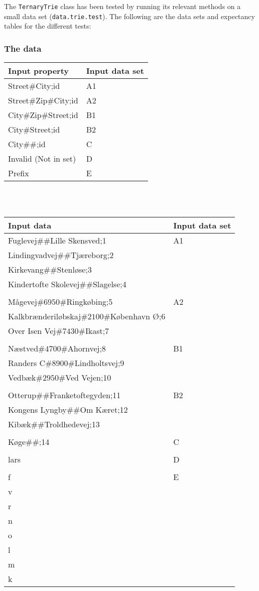 The \texttt{TernaryTrie} class has been tested by running its relevant methods on a small data set (\texttt{data.trie.test}). The following are the data sets and expectancy tables for the different tests:

\subsubsection{The data}
\begin{tabular}{ p{8cm} | p{2cm} }
	\textbf{Input property} & \textbf{Input data set} \\	
	\hline
	Street$\#$City;id & A1 \\
	Street$\#$Zip$\#$City;id & A2 \\
	City$\#$Zip$\#$Street;id & B1 \\
	City$\#$Street;id &  B2 \\
	City$\#\#$;id & C \\
	Invalid (Not in set) & D \\
	Prefix & E \\
\end{tabular}
\\
\\
\begin{tabular}{ p{8cm} | p{2cm} }
\textbf{Input data} & \textbf{Input data set} \\
	\hline
	Fuglevej$\#\#$Lille Skensved;1 & A1 \\
	Lindingvadvej$\#\#$Tj\ae reborg;2 \\
	Kirkevang$\#\#$Stenl\o se;3 \\
	Kindertofte Skolevej$\#\#$Slagelse;4 \\
	\\
	M\aa gevej$\#6950\#$Ringk\o bing;5 & A2 \\
	Kalkbr\ae nderil\o bskaj$\#2100\#$K\o benhavn \O ;6 \\
	Over Isen Vej$\#7430\#$Ikast;7 \\
	\\
	N\ae stved$\#4700\#$Ahornvej;8 & B1 \\
	Randers C$\#8900\#$Lindholtsvej;9 \\
	Vedb\ae k$\#2950\#$Ved Vejen;10 \\
	\\
	Otterup$\#\#$Franketoftegyden;11 & B2 \\
	Kongens Lyngby$\#\#$Om K\ae ret;12 \\
	Kib\ae k$\#\#$Troldhedevej;13 \\
	\\
	K\o ge$\#\#$;14 & C \\
	\\
	lars & D \\
	\\
	f & E \\
	v &   \\
	r &   \\
	n &   \\
	o &   \\
	l &   \\
	m &   \\
	k &   \\
\end{tabular}

